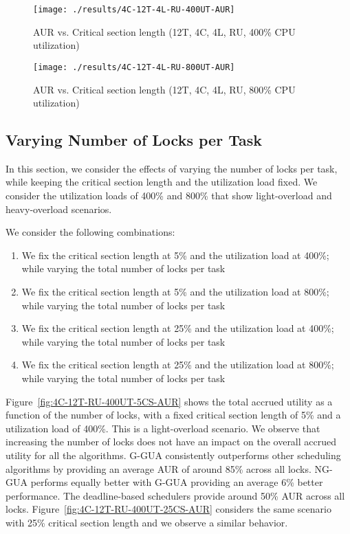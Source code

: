 \documentclass[12pt,dvips]{report}
\begin{document}
\begin{figure} [htbp]
  \centering
  \texttt{[image: ./results/4C-12T-4L-RU-400UT-AUR]}
  \caption{AUR vs. Critical section length (12T, 4C, 4L, RU, 400\% CPU utilization) }
    \label{fig:4C-12T-4L-RU-400UT-AUR}
\end{figure} 
 
\begin{figure} [htbp]
  \centering
  \texttt{[image: ./results/4C-12T-4L-RU-800UT-AUR]}
  \caption{AUR vs. Critical section length (12T, 4C, 4L, RU, 800\% CPU utilization) }
    \label{fig:4C-12T-4L-RU-800UT-AUR}
\end{figure}

\pagebreak

\subsection{Varying Number of Locks per Task}\label{sec:vary-numlocks}
 
In this section, we consider the effects of varying the number of locks per task, while keeping the critical section length and the utilization load fixed. We consider the utilization loads of 400\% and 800\% that show light-overload and heavy-overload scenarios.

We consider the following combinations:
\begin{enumerate}
\item We fix the critical section length at 5\% and the utilization load at 400\%; while varying the total number of locks per task
\item We fix the critical section length at 5\% and the utilization load at 800\%; while varying the total number of locks per task
\item We fix the critical section length at 25\% and the utilization load at 400\%; while varying the total number of locks per task
\item We fix the critical section length at 25\% and the utilization load at 800\%; while varying the total number of locks per task
\end{enumerate}
 
Figure~\ref{fig:4C-12T-RU-400UT-5CS-AUR} shows the total accrued utility as a function of the number of locks, with a fixed critical section length of 5\% and a utilization load of 400\%. This is a light-overload scenario. We observe that increasing the number of locks does not have an impact on the overall accrued utility for all the algorithms. G-GUA consistently outperforms other scheduling algorithms by providing an average AUR of around 85\% across all locks. NG-GUA performs equally better with G-GUA providing an average 6\% better performance. The deadline-based schedulers provide around 50\% AUR across all locks. Figure~\ref{fig:4C-12T-RU-400UT-25CS-AUR} considers the same scenario with 25\% critical section length and we observe a similar behavior. 
 
\end{document}
